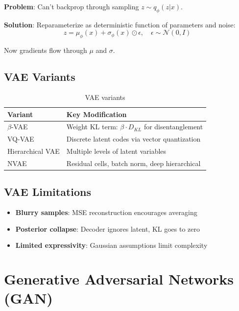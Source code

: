 \textbf{Problem}: Can't backprop through sampling $z \sim q_\phi(z|x)$.

\textbf{Solution}: Reparameterize as deterministic function of parameters and noise:
\begin{equation}
z = \mu_\phi(x) + \sigma_\phi(x) \odot \epsilon, \quad \epsilon \sim \mathcal{N}(0, I)
\end{equation}

Now gradients flow through $\mu$ and $\sigma$.

\subsection{VAE Variants}

\begin{table}[H]
\centering
\caption{VAE variants}
\begin{tabularx}{\textwidth}{lX}
\toprule
\textbf{Variant} & \textbf{Key Modification} \\
\midrule
$\beta$-VAE & Weight KL term: $\beta \cdot D_{KL}$ for disentanglement \\
VQ-VAE & Discrete latent codes via vector quantization \\
Hierarchical VAE & Multiple levels of latent variables \\
NVAE & Residual cells, batch norm, deep hierarchical \\
\bottomrule
\end{tabularx}
\end{table}

\subsection{VAE Limitations}

\begin{itemize}
    \item \textbf{Blurry samples}: MSE reconstruction encourages averaging
    \item \textbf{Posterior collapse}: Decoder ignores latent, KL goes to zero
    \item \textbf{Limited expressivity}: Gaussian assumptions limit complexity
\end{itemize}

\section{Generative Adversarial Networks (GAN)}
\label{sec:gan}

